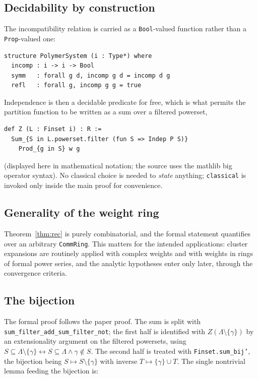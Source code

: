\documentclass[11pt]{amsart}
\begin{document}
\subsection{Decidability by construction}
The incompatibility relation is carried as a \texttt{Bool}-valued function
rather than a \texttt{Prop}-valued one:

\begin{lstlisting}
structure PolymerSystem (i : Type*) where
  incomp : i -> i -> Bool
  symm   : forall g d, incomp g d = incomp d g
  refl   : forall g, incomp g g = true
\end{lstlisting}

Independence is then a decidable predicate for free, which is what permits
the partition function to be written as a sum over a filtered powerset,
\begin{lstlisting}
def Z (L : Finset i) : R :=
  Sum_{S in L.powerset.filter (fun S => Indep P S)}
    Prod_{g in S} w g
\end{lstlisting}
(displayed here in mathematical notation; the source uses the
\textsf{mathlib} big operator syntax). No classical choice is needed to
\emph{state} anything; \texttt{classical} is invoked only inside the main
proof for convenience.

\subsection{Generality of the weight ring}
Theorem~\ref{thm:rec} is purely combinatorial, and the formal statement
quantifies over an arbitrary \texttt{CommRing}. This matters for the
intended applications: cluster expansions are routinely applied with complex
weights and with weights in rings of formal power series, and the analytic
hypotheses enter only later, through the convergence criteria.

\subsection{The bijection}
The formal proof follows the paper proof. The sum is split with
\texttt{sum\_filter\_add\_sum\_filter\_not}; the first half is identified
with $Z(\Lambda \setminus \{\gamma\})$ by an extensionality argument on the
filtered powersets, using
$S \subseteq \Lambda \setminus \{\gamma\} \leftrightarrow
S \subseteq \Lambda \wedge \gamma \notin S$. The second half is treated with
\texttt{Finset.sum\_bij'}, the bijection being
$S \mapsto S \setminus \{\gamma\}$ with inverse
$T \mapsto \{\gamma\} \cup T$. The single nontrivial lemma feeding the
bijection is:
\end{document}

